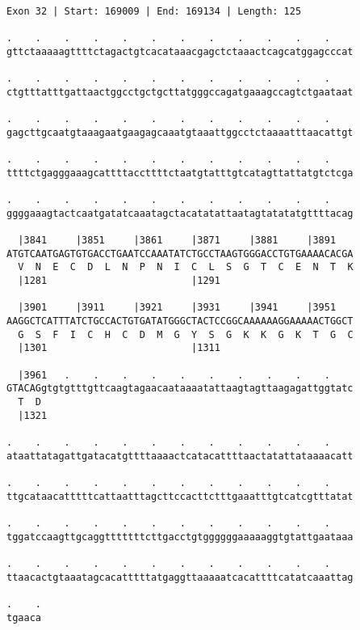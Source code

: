 \documentclass{article}
\begin{document}
\begin{Verbatim}[fontfamily=courier]
Exon 32 | Start: 169009 | End: 169134 | Length: 125

.    .    .    .    .    .    .    .    .    .    .    .    
gttctaaaaagttttctagactgtcacataaacgagctctaaactcagcatggagcccat

.    .    .    .    .    .    .    .    .    .    .    .    
ctgtttatttgattaactggcctgctgcttatgggccagatgaaagccagtctgaataat

.    .    .    .    .    .    .    .    .    .    .    .    
gagcttgcaatgtaaagaatgaagagcaaatgtaaattggcctctaaaatttaacattgt

.    .    .    .    .    .    .    .    .    .    .    .    
ttttctgagggaaagcattttaccttttctaatgtatttgtcatagttattatgtctcga

.    .    .    .    .    .    .    .    .    .    .    .    
ggggaaagtactcaatgatatcaaatagctacatatattaatagtatatatgttttacag

  |3841     |3851     |3861     |3871     |3881     |3891   
ATGTCAATGAGTGTGACCTGAATCCAAATATCTGCCTAAGTGGGACCTGTGAAAACACGA
  V  N  E  C  D  L  N  P  N  I  C  L  S  G  T  C  E  N  T  K
  |1281                         |1291                       

  |3901     |3911     |3921     |3931     |3941     |3951   
AAGGCTCATTTATCTGCCACTGTGATATGGGCTACTCCGGCAAAAAAGGAAAAACTGGCT
  G  S  F  I  C  H  C  D  M  G  Y  S  G  K  K  G  K  T  G  C
  |1301                         |1311                       

  |3961   .    .    .    .    .    .    .    .    .    .    
GTACAGgtgtgtttgttcaagtagaacaataaaatattaagtagttaagagattggtatc
  T  D                                                      
  |1321                                                     

.    .    .    .    .    .    .    .    .    .    .    .    
ataattatagattgatacatgttttaaaactcatacattttaactatattataaaacatt

.    .    .    .    .    .    .    .    .    .    .    .    
ttgcataacatttttcattaatttagcttccacttctttgaaatttgtcatcgtttatat

.    .    .    .    .    .    .    .    .    .    .    .    
tggatccaagttgcaggtttttttcttgacctgtggggggaaaaaggtgtattgaataaa

.    .    .    .    .    .    .    .    .    .    .    .    
ttaacactgtaaatagcacatttttatgaggttaaaaatcacattttcatatcaaattag

.    .
tgaaca
\end{Verbatim}
\newpage
\end{document}
